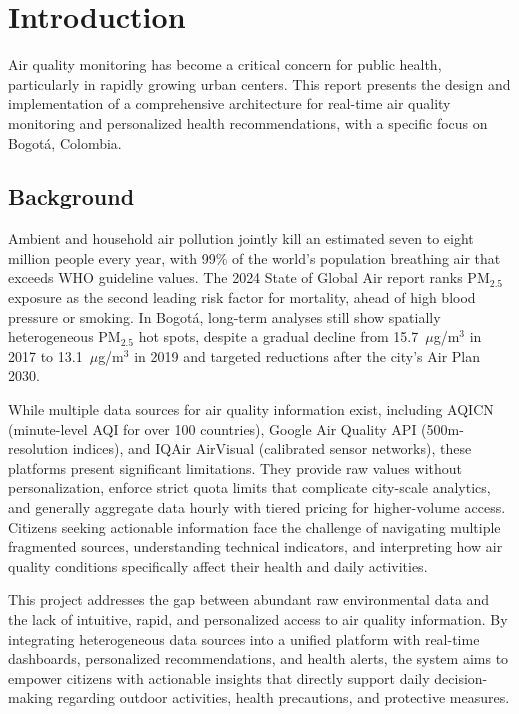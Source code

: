 \chapter{Introduction}
\label{ch:into}

Air quality monitoring has become a critical concern for public health, particularly in rapidly growing urban centers. This report presents the design and implementation of a comprehensive architecture for real-time air quality monitoring and personalized health recommendations, with a specific focus on Bogotá, Colombia.

\section{Background}
\label{sec:into_back}

Ambient and household air pollution jointly kill an estimated seven to eight million people every year, with 99\% of the world's population breathing air that exceeds WHO guideline values. The 2024 State of Global Air report ranks PM$_{2.5}$ exposure as the second leading risk factor for mortality, ahead of high blood pressure or smoking. In Bogotá, long-term analyses still show spatially heterogeneous PM$_{2.5}$ hot spots, despite a gradual decline from 15.7~$\mu$g/m$^3$ in 2017 to 13.1~$\mu$g/m$^3$ in 2019 and targeted reductions after the city's Air Plan 2030.

While multiple data sources for air quality information exist, including AQICN (minute-level AQI for over 100 countries), Google Air Quality API (500m-resolution indices), and IQAir AirVisual (calibrated sensor networks), these platforms present significant limitations. They provide raw values without personalization, enforce strict quota limits that complicate city-scale analytics, and generally aggregate data hourly with tiered pricing for higher-volume access. Citizens seeking actionable information face the challenge of navigating multiple fragmented sources, understanding technical indicators, and interpreting how air quality conditions specifically affect their health and daily activities.

This project addresses the gap between abundant raw environmental data and the lack of intuitive, rapid, and personalized access to air quality information. By integrating heterogeneous data sources into a unified platform with real-time dashboards, personalized recommendations, and health alerts, the system aims to empower citizens with actionable insights that directly support daily decision-making regarding outdoor activities, health precautions, and protective measures.


